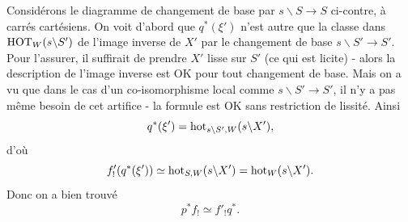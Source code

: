 Considérons le diagramme de changement de base par $s\backslash S\longrightarrow S$ ci-contre, à carrés cartésiens. On voit d'abord que $q^*(\xi')$ n'est autre que la classe dans $\mathrm{HOT}_W(s\backslash S')$ de l'image inverse de $X'$ par le changement de base $s\backslash S'\longrightarrow S'$. Pour l'assurer, il suffirait de prendre $X'$ lisse sur $S'$ (ce qui
est licite) - alors la description de l'image inverse est OK pour tout changement de base. Mais on a vu que dans le cas d'un co-isomorphisme local comme $s\backslash S'\longrightarrow S'$, il n'y a pas même besoin de cet artifice - la formule est OK sans restriction de lissité. Ainsi
\[q^*(\xi')=\mathrm{hot}_{s\backslash S',W}(s\backslash X'),\]
d'où
\[f'_!(q^*(\xi'))\simeq\mathrm{hot}_{S,W}(s\backslash X')=\mathrm{hot}_W(s\backslash X').\]
Donc on a bien trouvé
\[p^*f_!\simeq f'_!q^*.\]

